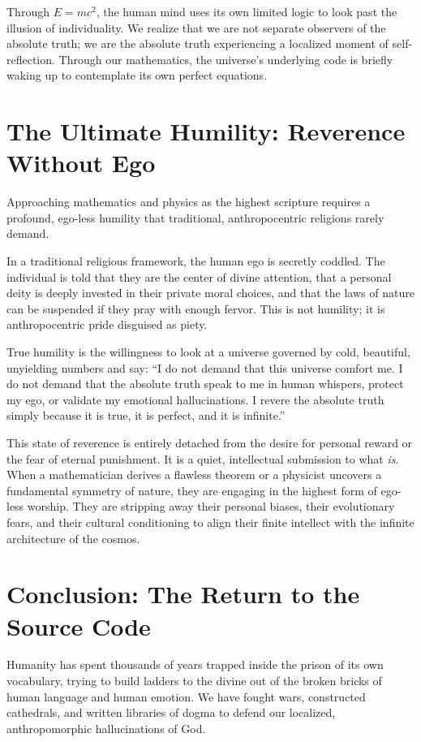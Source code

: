 \documentclass[12pt]{article}
\begin{document}
Through $E=mc^2$, the human mind uses its own limited logic to look past the illusion of individuality. We realize that we are not separate observers of the absolute truth; we are the absolute truth experiencing a localized moment of self-reflection. Through our mathematics, the universe’s underlying code is briefly waking up to contemplate its own perfect equations.

\section{The Ultimate Humility: Reverence Without Ego}
Approaching mathematics and physics as the highest scripture requires a profound, ego-less humility that traditional, anthropocentric religions rarely demand. 

In a traditional religious framework, the human ego is secretly coddled. The individual is told that they are the center of divine attention, that a personal deity is deeply invested in their private moral choices, and that the laws of nature can be suspended if they pray with enough fervor. This is not humility; it is anthropocentric pride disguised as piety.

True humility is the willingness to look at a universe governed by cold, beautiful, unyielding numbers and say: ``I do not demand that this universe comfort me. I do not demand that the absolute truth speak to me in human whispers, protect my ego, or validate my emotional hallucinations. I revere the absolute truth simply because it is true, it is perfect, and it is infinite.''

This state of reverence is entirely detached from the desire for personal reward or the fear of eternal punishment. It is a quiet, intellectual submission to what \textit{is}. When a mathematician derives a flawless theorem or a physicist uncovers a fundamental symmetry of nature, they are engaging in the highest form of ego-less worship. They are stripping away their personal biases, their evolutionary fears, and their cultural conditioning to align their finite intellect with the infinite architecture of the cosmos.

\section{Conclusion: The Return to the Source Code}
Humanity has spent thousands of years trapped inside the prison of its own vocabulary, trying to build ladders to the divine out of the broken bricks of human language and human emotion. We have fought wars, constructed cathedrals, and written libraries of dogma to defend our localized, anthropomorphic hallucinations of God.
\end{document}
